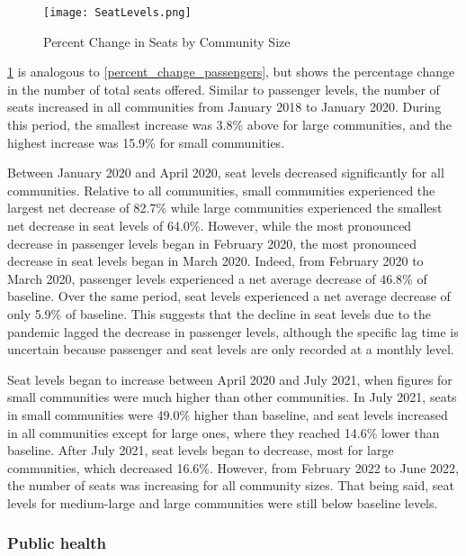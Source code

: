 \documentclass[11pt]{article}
\begin{document}
\begin{figure}[htbp!]
\centerline{\texttt{[image: SeatLevels.png]}}
\caption{Percent Change in Seats by Community Size}
\label{percent_change_seats}
\end{figure}

\cref{percent_change_seats} is analogous to \cref{percent_change_passengers}, but shows the percentage change in the number of total seats offered. Similar to passenger levels, the number of seats increased in all communities from January 2018 to January 2020. During this period, the smallest increase was 3.8\% above for large communities, and the highest increase was 15.9\% for small communities. 

\-\hspace{0.5cm} Between January 2020 and April 2020, seat levels decreased significantly for all communities. Relative to all communities, small communities experienced the largest net decrease of 82.7\% while large communities experienced the smallest net decrease in seat levels of 64.0\%. However, while the most pronounced decrease in passenger levels began in February 2020, the most pronounced decrease in seat levels began in March 2020. Indeed, from February 2020 to March 2020, passenger levels experienced a net average decrease of 46.8\% of baseline. Over the same period, seat levels experienced a net average decrease of only 5.9\% of baseline. This suggests that the decline in seat levels due to the pandemic lagged the decrease in passenger levels, although the specific lag time is uncertain because passenger and seat levels are only recorded at a monthly level.

\-\hspace{0.5cm} Seat levels began to increase between April 2020 and July 2021, when figures for small communities were much higher than other communities. In July 2021, seats in small communities were 49.0\% higher than baseline, and seat levels increased in all communities except for large ones, where they reached 14.6\% lower than baseline. After July 2021, seat levels began to decrease, most for large communities, which decreased 16.6\%. However, from February 2022 to June 2022, the number of seats was increasing for all community sizes. That being said, seat levels for medium-large and large communities were still below baseline levels.

\subsubsection{Public health}
\end{document}
